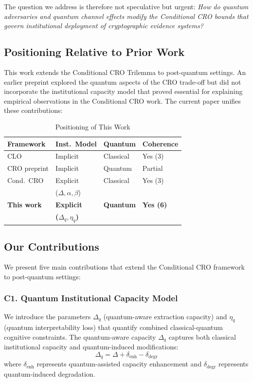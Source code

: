 \documentclass{ieeeaccess}
\begin{document}
The question we address is therefore not speculative but urgent: \textit{How do quantum adversaries and quantum channel effects modify the Conditional CRO bounds that govern institutional deployment of cryptographic evidence systems?}

\subsection{Positioning Relative to Prior Work}

This work extends the Conditional CRO Trilemma \cite{Minka2026CRO} to post-quantum settings. An earlier preprint \cite{CRO2025} explored the quantum aspects of the CRO trade-off but did not incorporate the institutional capacity model that proved essential for explaining empirical observations in the Conditional CRO work. The current paper unifies these contributions:

\begin{table}[t]
\centering
\caption{Positioning of This Work}
\label{tab:positioning}
\small
\setlength{\tabcolsep}{4pt}
\begin{tabular}{p{1.9cm}p{1.7cm}p{1.2cm}p{1.4cm}}
\toprule
\textbf{Framework} 
  & \textbf{Inst.\ Model} 
  & \textbf{Quantum} 
  & \textbf{Coherence} \\
\midrule
CLO \cite{Minka2026CLO}          
  & Implicit        & Classical & Yes (3) \\
CRO preprint \cite{CRO2025}      
  & Implicit        & Quantum   & Partial \\
Cond.\ CRO \cite{Minka2026CRO}   
  & Explicit        & Classical & Yes (3) \\
  & ($\Delta,\alpha,\beta$) & & \\
\textbf{This work}               
  & \textbf{Explicit}       
  & \textbf{Quantum}  
  & \textbf{Yes (6)} \\
  & \textbf{($\Delta_q,\eta_q$)} & & \\
\bottomrule
\end{tabular}
\end{table}

\subsection{Our Contributions}

We present five main contributions that extend the Conditional CRO framework to post-quantum settings:

\subsubsection{C1. Quantum Institutional Capacity Model}
We introduce the parameters $\Delta_q$ (quantum-aware extraction capacity) and $\eta_q$ (quantum interpretability loss) that quantify combined classical-quantum cognitive constraints. The quantum-aware capacity $\Delta_q$ captures both classical institutional capacity and quantum-induced modifications:
\[
\Delta_q = \Delta + \delta_{\text{enh}} - \delta_{\text{degr}}
\]
where $\delta_{\text{enh}}$ represents quantum-assisted capacity enhancement and $\delta_{\text{degr}}$ represents quantum-induced degradation.
\end{document}
